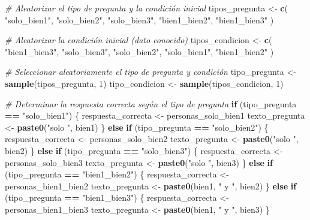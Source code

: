 \documentclass[
]{article}
\newenvironment{Shaded}{\begin{snugshade}}{\end{snugshade}}
\newcommand{\CommentTok}[1]{\textcolor[rgb]{0.56,0.35,0.01}{\textit{#1}}}
\newcommand{\ControlFlowTok}[1]{\textcolor[rgb]{0.13,0.29,0.53}{\textbf{#1}}}
\newcommand{\DecValTok}[1]{\textcolor[rgb]{0.00,0.00,0.81}{#1}}
\newcommand{\FunctionTok}[1]{\textcolor[rgb]{0.13,0.29,0.53}{\textbf{#1}}}
\newcommand{\NormalTok}[1]{#1}
\newcommand{\OtherTok}[1]{\textcolor[rgb]{0.56,0.35,0.01}{#1}}
\newcommand{\SpecialCharTok}[1]{\textcolor[rgb]{0.81,0.36,0.00}{\textbf{#1}}}
\newcommand{\StringTok}[1]{\textcolor[rgb]{0.31,0.60,0.02}{#1}}
\begin{document}
\begin{Shaded}
\begin{Highlighting}[]
\CommentTok{\# Aleatorizar el tipo de pregunta y la condición inicial}
\NormalTok{tipos\_pregunta }\OtherTok{\textless{}{-}} \FunctionTok{c}\NormalTok{(}
  \StringTok{"solo\_bien1"}\NormalTok{,}
  \StringTok{"solo\_bien2"}\NormalTok{,}
  \StringTok{"solo\_bien3"}\NormalTok{,}
  \StringTok{"bien1\_bien2"}\NormalTok{,}
  \StringTok{"bien1\_bien3"}
\NormalTok{)}

\CommentTok{\# Aleatorizar la condición inicial (dato conocido)}
\NormalTok{tipos\_condicion }\OtherTok{\textless{}{-}} \FunctionTok{c}\NormalTok{(}
  \StringTok{"bien1\_bien3"}\NormalTok{,}
  \StringTok{"solo\_bien3"}\NormalTok{,}
  \StringTok{"solo\_bien2"}\NormalTok{,}
  \StringTok{"solo\_bien1"}\NormalTok{,}
  \StringTok{"bien1\_bien2"}
\NormalTok{)}

\CommentTok{\# Seleccionar aleatoriamente el tipo de pregunta y condición}
\NormalTok{tipo\_pregunta }\OtherTok{\textless{}{-}} \FunctionTok{sample}\NormalTok{(tipos\_pregunta, }\DecValTok{1}\NormalTok{)}
\NormalTok{tipo\_condicion }\OtherTok{\textless{}{-}} \FunctionTok{sample}\NormalTok{(tipos\_condicion, }\DecValTok{1}\NormalTok{)}

\CommentTok{\# Determinar la respuesta correcta según el tipo de pregunta}
\ControlFlowTok{if}\NormalTok{ (tipo\_pregunta }\SpecialCharTok{==} \StringTok{"solo\_bien1"}\NormalTok{) \{}
\NormalTok{  respuesta\_correcta }\OtherTok{\textless{}{-}}\NormalTok{ personas\_solo\_bien1}
\NormalTok{  texto\_pregunta }\OtherTok{\textless{}{-}} \FunctionTok{paste0}\NormalTok{(}\StringTok{"solo "}\NormalTok{, bien1)}
\NormalTok{\} }\ControlFlowTok{else} \ControlFlowTok{if}\NormalTok{ (tipo\_pregunta }\SpecialCharTok{==} \StringTok{"solo\_bien2"}\NormalTok{) \{}
\NormalTok{  respuesta\_correcta }\OtherTok{\textless{}{-}}\NormalTok{ personas\_solo\_bien2}
\NormalTok{  texto\_pregunta }\OtherTok{\textless{}{-}} \FunctionTok{paste0}\NormalTok{(}\StringTok{"solo "}\NormalTok{, bien2)}
\NormalTok{\} }\ControlFlowTok{else} \ControlFlowTok{if}\NormalTok{ (tipo\_pregunta }\SpecialCharTok{==} \StringTok{"solo\_bien3"}\NormalTok{) \{}
\NormalTok{  respuesta\_correcta }\OtherTok{\textless{}{-}}\NormalTok{ personas\_solo\_bien3}
\NormalTok{  texto\_pregunta }\OtherTok{\textless{}{-}} \FunctionTok{paste0}\NormalTok{(}\StringTok{"solo "}\NormalTok{, bien3)}
\NormalTok{\} }\ControlFlowTok{else} \ControlFlowTok{if}\NormalTok{ (tipo\_pregunta }\SpecialCharTok{==} \StringTok{"bien1\_bien2"}\NormalTok{) \{}
\NormalTok{  respuesta\_correcta }\OtherTok{\textless{}{-}}\NormalTok{ personas\_bien1\_bien2}
\NormalTok{  texto\_pregunta }\OtherTok{\textless{}{-}} \FunctionTok{paste0}\NormalTok{(bien1, }\StringTok{" y "}\NormalTok{, bien2)}
\NormalTok{\} }\ControlFlowTok{else} \ControlFlowTok{if}\NormalTok{ (tipo\_pregunta }\SpecialCharTok{==} \StringTok{"bien1\_bien3"}\NormalTok{) \{}
\NormalTok{  respuesta\_correcta }\OtherTok{\textless{}{-}}\NormalTok{ personas\_bien1\_bien3}
\NormalTok{  texto\_pregunta }\OtherTok{\textless{}{-}} \FunctionTok{paste0}\NormalTok{(bien1, }\StringTok{" y "}\NormalTok{, bien3)}
\NormalTok{\}}


\end{Highlighting}
\end{Shaded}
\end{document}
